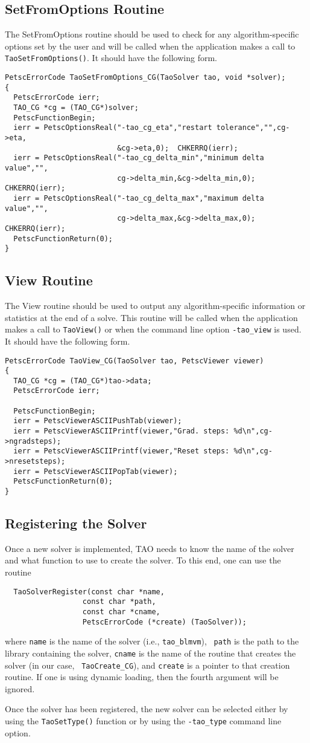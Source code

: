 \subsection{SetFromOptions Routine}
The SetFromOptions routine should be used to check for any 
algorithm-specific options set 
by the user and will be called when the application makes a call
to {\tt TaoSetFromOptions()}.  It should have the following form.
\begin{verbatim}
PetscErrorCode TaoSetFromOptions_CG(TaoSolver tao, void *solver);
{
  PetscErrorCode ierr;
  TAO_CG *cg = (TAO_CG*)solver;
  PetscFunctionBegin;
  ierr = PetscOptionsReal("-tao_cg_eta","restart tolerance","",cg->eta,
                          &cg->eta,0);  CHKERRQ(ierr);
  ierr = PetscOptionsReal("-tao_cg_delta_min","minimum delta value","",
                          cg->delta_min,&cg->delta_min,0); CHKERRQ(ierr);
  ierr = PetscOptionsReal("-tao_cg_delta_max","maximum delta value","",
                          cg->delta_max,&cg->delta_max,0); CHKERRQ(ierr);
  PetscFunctionReturn(0);
}
\end{verbatim}

\subsection{View Routine}
The View routine should be used to output any algorithm-specific information
or statistics at the end of a solve.
This routine will be called when the application makes a call to 
{\tt TaoView()} or when the command line option {\tt -tao\_view} is used.
It should have the following form.
\begin{verbatim}
PetscErrorCode TaoView_CG(TaoSolver tao, PetscViewer viewer)
{ 
  TAO_CG *cg = (TAO_CG*)tao->data;
  PetscErrorCode ierr;

  PetscFunctionBegin;
  ierr = PetscViewerASCIIPushTab(viewer);
  ierr = PetscViewerASCIIPrintf(viewer,"Grad. steps: %d\n",cg->ngradsteps);
  ierr = PetscViewerASCIIPrintf(viewer,"Reset steps: %d\n",cg->nresetsteps);
  ierr = PetscViewerASCIIPopTab(viewer);
  PetscFunctionReturn(0);
}
\end{verbatim}


\subsection{Registering the Solver}
Once a new solver is implemented, TAO needs to know the name of
the solver and what function to use to create the solver.  To this end, one
can use the routine
\begin{verbatim}
  TaoSolverRegister(const char *name, 
                  const char *path,
                  const char *cname, 
                  PetscErrorCode (*create) (TaoSolver));
\end{verbatim}
\noindent
where {\tt name} is the name of the solver (i.e., {\tt tao\_blmvm}), {\tt
path} is the path to the library containing the solver, {\tt cname} is the
name of the routine that creates the solver (in our case, {\tt
  TaoCreate\_CG}), and {\tt create} is a pointer to that creation
routine.  If one is using dynamic loading, then the fourth argument will be
ignored. 

Once the solver has been registered, the new solver can be selected 
either by using the \texttt{TaoSetType()} function or by using the \texttt{-tao\_type} command line option.



